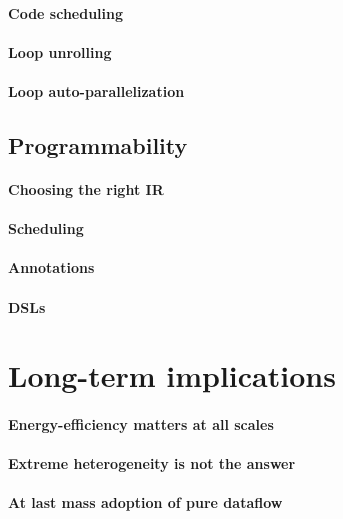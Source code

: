 			\paragraph{Code scheduling}
			\paragraph{Loop unrolling}
			\paragraph{Loop auto-parallelization}

	\subsection{Programmability}
		\paragraph{Choosing the right IR}
		\paragraph{Scheduling}
		\paragraph{Annotations}
		\paragraph{DSLs}

\section{Long-term implications}
\paragraph{Energy-efficiency matters at all scales}
\paragraph{Extreme heterogeneity is not the answer}
\paragraph{At last mass adoption of pure dataflow}
